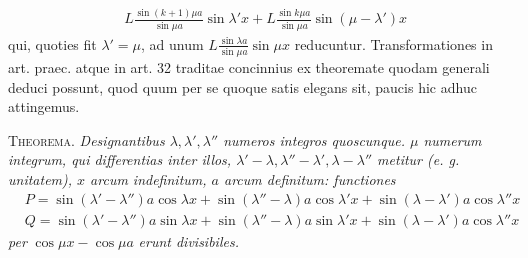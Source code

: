 \[
\begin{aligned}
&L\frac{\sin(k+1)\mu a}{\sin\mu a}\sin\lambda'x+L\frac{\sin k\mu a}{\sin\mu a}\sin(\mu-\lambda')x
\end{aligned}
\]
qui, quoties fit $\lambda'=\mu$, ad unum $L\frac{\sin\lambda a}{\sin\mu a}\sin\mu x$ reducuntur.
Transformationes in art. praec. atque in art. 32 traditae concinnius ex theoremate quodam generali deduci possunt, quod quum per se quoque satis elegans sit, paucis hic adhuc attingemus.

\textsc{Theorema.} \textit{Designantibus $\lambda,\lambda',\lambda''$ numeros integros quoscunque. $\mu$ numerum integrum, qui differentias inter illos, $\lambda'-\lambda,\lambda''-\lambda',\lambda-\lambda''$ metitur (e. g. unitatem), $x$ arcum indefinitum, $a$ arcum definitum: functiones}
\[
\begin{aligned}
&P=\sin(\lambda'-\lambda'')a\cos\lambda x+\sin(\lambda''-\lambda)a\cos\lambda'x+\sin(\lambda-\lambda')a\cos\lambda''x\\[5pt]
&Q=\sin(\lambda'-\lambda'')a\sin\lambda x+\sin(\lambda''-\lambda)a\sin\lambda'x+\sin(\lambda-\lambda')a\cos\lambda''x
\end{aligned}
\]
\textit{per} $\cos\mu x-\cos\mu a$ \textit{erunt divisibiles.}

